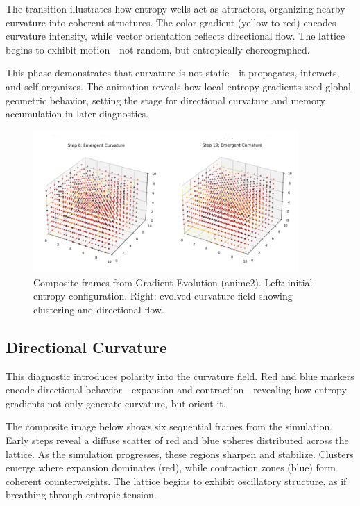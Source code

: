 \documentclass[12pt]{article}
\begin{document}
The transition illustrates how entropy wells act as attractors, organizing nearby curvature into coherent structures. The color gradient (yellow to red) encodes curvature intensity, while vector orientation reflects directional flow. The lattice begins to exhibit motion—not random, but entropically choreographed.

This phase demonstrates that curvature is not static—it propagates, interacts, and self-organizes. The animation reveals how local entropy gradients seed global geometric behavior, setting the stage for directional curvature and memory accumulation in later diagnostics.

\begin{figure}[h]
    \centering
    \includegraphics[width=0.9\textwidth]{Figures/Figure_7.PNG}
    \caption{Composite frames from Gradient Evolution (anime2). Left: initial entropy configuration. Right: evolved curvature field showing clustering and directional flow.}
    \label{fig:gradient_evolution}
\end{figure}

\subsection{Directional Curvature}

This diagnostic introduces polarity into the curvature field. Red and blue markers encode directional behavior—expansion and contraction—revealing how entropy gradients not only generate curvature, but orient it.

The composite image below shows six sequential frames from the simulation. Early steps reveal a diffuse scatter of red and blue spheres distributed across the lattice. As the simulation progresses, these regions sharpen and stabilize. Clusters emerge where expansion dominates (red), while contraction zones (blue) form coherent counterweights. The lattice begins to exhibit oscillatory structure, as if breathing through entropic tension.
\end{document}
